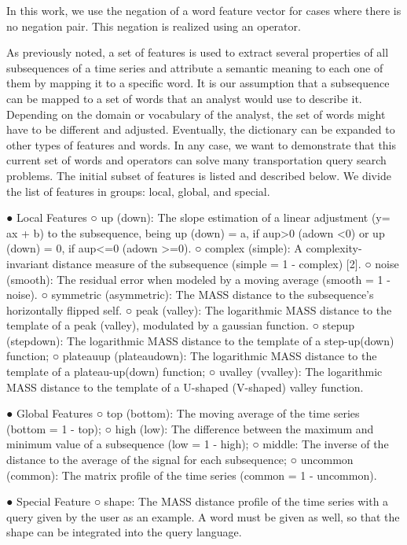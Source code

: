 {In this work, we use the negation of a word feature vector for cases where there is no negation pair. This negation is realized using an operator.



As previously noted, a set of features is used to extract several properties of all subsequences of a time series and attribute a semantic meaning to each one of them by mapping it to a specific word. It is our assumption that a subsequence can be mapped to a set of words that an analyst would use to describe it. Depending on the domain or vocabulary of the analyst, the set of words might have to be different and adjusted. Eventually, the dictionary can be expanded to other types of features and words. In any case, we want to demonstrate that this current set of words and operators can solve many transportation query search problems.
The initial subset of features is listed and described below. We divide the list of features in groups: local, global, and special. 

●	Local Features
○	up (down): The slope estimation of a linear adjustment (y= ax + b) to the subsequence, being up (down) = a, if aup>0 (adown <0) or up (down) = 0, if aup<=0 (adown >=0).
○	complex (simple): A complexity-invariant distance measure of the subsequence (simple = 1 - complex) [2].
○	noise (smooth): The residual error when modeled by a moving average (smooth = 1 - noise). 
○	symmetric (asymmetric): The MASS distance to the subsequence’s horizontally flipped self. 
○	peak (valley): The logarithmic MASS distance to the template of a peak (valley), modulated by a gaussian function.
○	stepup (stepdown): The logarithmic MASS distance to the template of a step-up(down) function;
○	plateauup (plateaudown): The logarithmic MASS distance to the template of a plateau-up(down) function;
○	uvalley (vvalley): The logarithmic MASS distance to the template of a U-shaped (V-shaped) valley function.

●	Global Features
○	top (bottom): The moving average of the time series (bottom = 1 - top);
○	high (low): The difference between the maximum and minimum value of a subsequence (low = 1 - high);
○	middle: The inverse of the distance to the average of the signal for each subsequence;
○	uncommon (common): The matrix profile of the time series (common = 1 - uncommon).

●	Special Feature
○	shape: The MASS distance profile of the time series with a query given by the user as an example. A word must be given as well, so that the shape can be integrated into the query language.    

}
